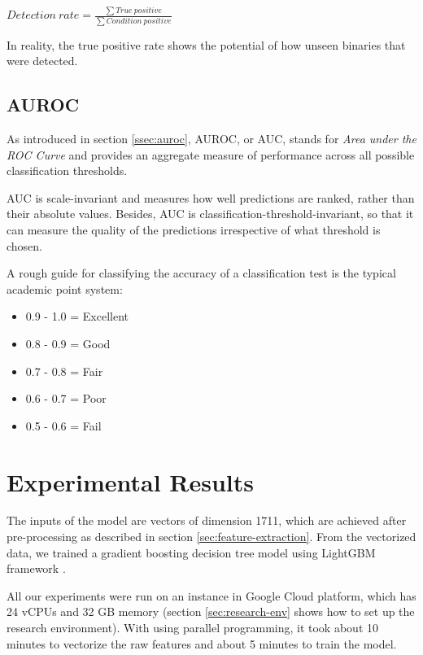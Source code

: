 \begin{center}
    ${Detection\ rate} =  \frac{\sum True\ positive}{\sum Condition\ positive}$
\end{center}

In reality, the true positive rate shows the potential of how unseen binaries that were detected.

\subsection{AUROC}

As introduced in section \ref{ssec:auroc}, AUROC, or AUC, stands for \textit{Area under the ROC Curve} and provides an aggregate measure of performance across all possible classification thresholds.

AUC is scale-invariant and measures how well predictions are ranked, rather than their absolute values. Besides, AUC is classification-threshold-invariant, so that it can measure the quality of the predictions irrespective of what threshold is chosen.

A rough guide for classifying the accuracy of a classification test is the typical academic point system: 

\begin{itemize}
\item 0.9 - 1.0 = Excellent
\item 0.8 - 0.9 = Good
\item 0.7 - 0.8 = Fair
\item 0.6 - 0.7 = Poor
\item 0.5 - 0.6 = Fail
\end{itemize}

\section{Experimental Results}

The inputs of the model are vectors of dimension 1711, which are achieved after pre-processing as described in section \ref{sec:feature-extraction}. From the vectorized data, we trained a gradient boosting decision tree model using LightGBM framework \cite{ke2017lightgbm}. 

All our experiments were run on an instance in Google Cloud platform, which has 24 vCPUs and 32 GB memory (section \ref{sec:research-env} shows how to set up the research environment). With using parallel programming, it took about 10 minutes to vectorize the raw features and about 5 minutes to train the model. 

